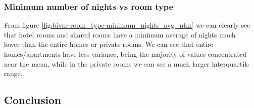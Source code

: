 \pagebreak

\subsubsection{Minimum number of nights vs room type}


From figure \cref{fig:bivar-room_type-minimum_nights_avg_ntm} we can clearly see
that hotel rooms and shared rooms have a minimum average of nights much lower
than the entire homes or private rooms.  We can see that entire homes/apartments
have less variance, being the majority of values concentrated near the mean,
while in the private rooms we can see a much larger interquartile range.

\subsection{Conclusion}%
\label{sub:data-conclusion} %


